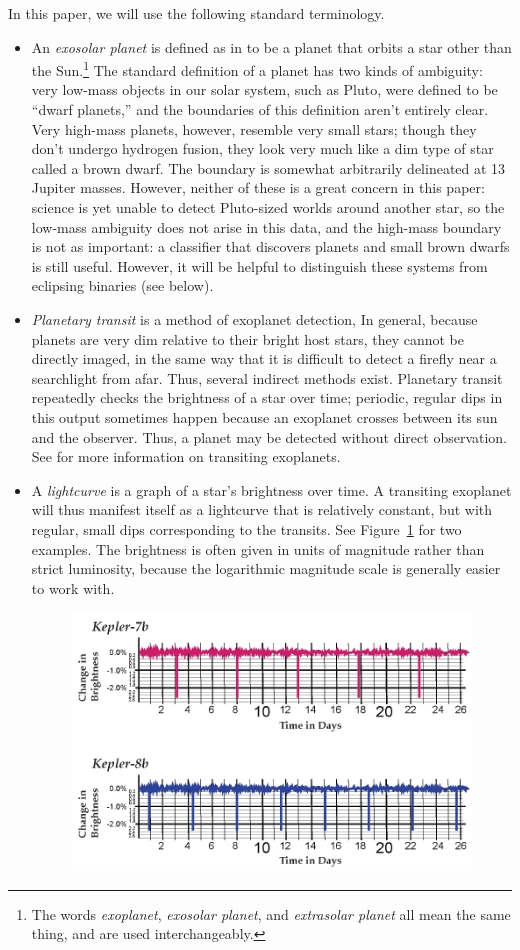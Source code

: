 \documentclass{amsart}
\begin{document}
In this paper, we will use the following standard terminology.
\begin{itemize}
	\item An \emph{exosolar planet} is defined as in \cite{Ovr} to be a planet that orbits a star other than the Sun.\footnote{The words \emph{exoplanet}, \emph{exosolar planet}, and \emph{extrasolar planet} all mean the same thing, and are used interchangeably.} The standard definition of a planet has two kinds of ambiguity: very low-mass objects in our solar system, such as Pluto, were defined to be ``dwarf planets,'' and the boundaries of this definition aren't entirely clear. Very high-mass planets, however, resemble very small stars; though they don't undergo hydrogen fusion, they look very much like a dim type of star called a brown dwarf. The boundary is somewhat arbitrarily delineated at 13 Jupiter masses. However, neither of these is a great concern in this paper: science is yet unable to detect Pluto-sized worlds around another star, so the low-mass ambiguity does not arise in this data, and the high-mass boundary is not as important: a classifier that discovers planets and small brown dwarfs is still useful. However, it will be helpful to distinguish these systems from eclipsing binaries (see below).
	\item \emph{Planetary transit} is a method of exoplanet detection, In general, because planets are very dim relative to their bright host stars, they cannot be directly imaged, in the same way that it is difficult to detect a firefly near a searchlight from afar. Thus, several indirect methods exist. Planetary transit repeatedly checks the brightness of a star over time; periodic, regular dips in this output sometimes happen because an exoplanet crosses between its sun and the observer. Thus, a planet may be detected without direct observation. See \cite{Trs} for more information on transiting exoplanets.
	\item A \emph{lightcurve} is a graph of a star's brightness over time. A transiting exoplanet will thus manifest itself as a lightcurve that is relatively constant, but with regular, small dips corresponding to the transits. See Figure~\ref{curves} for two examples.
	 The brightness is often given in units of magnitude rather than strict luminosity, because the logarithmic magnitude scale is generally easier to work with.
	\begin{figure}
	\centering
	\label{curves}
	\includegraphics[width=6in]{transit_lightcurve}

\end{figure}
\end{itemize}
\end{document}
